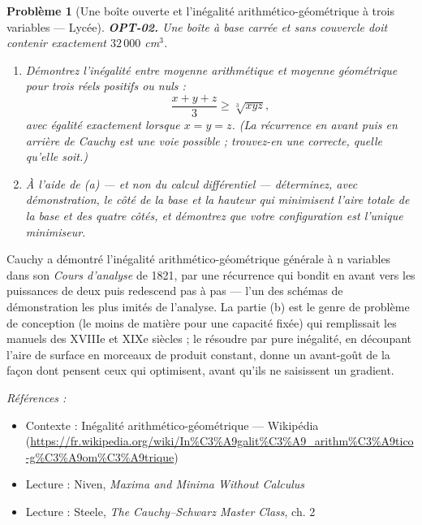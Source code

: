 \documentclass[11pt]{article}
\newtheorem{problem}{Problème}
\newenvironment{refs}{\par\small\noindent\emph{Références :}\begin{itemize}\setlength\itemsep{0pt}}{\end{itemize}\normalsize}
\begin{document}
\bigskip

\begin{problem}[{Une boîte ouverte et l'inégalité arithmético-géométrique à trois variables --- Lycée}]
\textbf{OPT-02.} Une boîte à base carrée et sans couvercle doit contenir exactement $32\,000$ cm$^3$.
\begin{enumerate}
\item[(a)] Démontrez l'inégalité entre moyenne arithmétique et moyenne géométrique pour trois réels positifs ou nuls :
\[ \frac{x+y+z}{3} \ge \sqrt[3]{xyz}, \]
avec égalité exactement lorsque $x = y = z$. (La récurrence en avant puis en arrière de Cauchy est une voie possible ; trouvez-en une correcte, quelle qu'elle soit.)
\item[(b)] À l'aide de (a) --- et non du calcul différentiel --- déterminez, avec démonstration, le côté de la base et la hauteur qui minimisent l'aire totale de la base et des quatre côtés, et démontrez que votre configuration est l'unique minimiseur.
\end{enumerate}

\end{problem}

\noindent Cauchy a démontré l'inégalité arithmético-géométrique générale à n variables dans son \textit{Cours d'analyse} de 1821, par une récurrence qui bondit en avant vers les puissances de deux puis redescend pas à pas --- l'un des schémas de démonstration les plus imités de l'analyse. La partie (b) est le genre de problème de conception (le moins de matière pour une capacité fixée) qui remplissait les manuels des XVIIIe et XIXe siècles ; le résoudre par pure inégalité, en découpant l'aire de surface en morceaux de produit constant, donne un avant-goût de la façon dont pensent ceux qui optimisent, avant qu'ils ne saisissent un gradient.

\begin{refs}
\item Contexte : Inégalité arithmético-géométrique --- Wikipédia (\url{https://fr.wikipedia.org/wiki/In%C3%A9galit%C3%A9_arithm%C3%A9tico-g%C3%A9om%C3%A9trique})
\item Lecture : Niven, \textit{Maxima and Minima Without Calculus}
\item Lecture : Steele, \textit{The Cauchy--Schwarz Master Class}, ch. 2
\end{refs}

\bigskip
\end{document}

